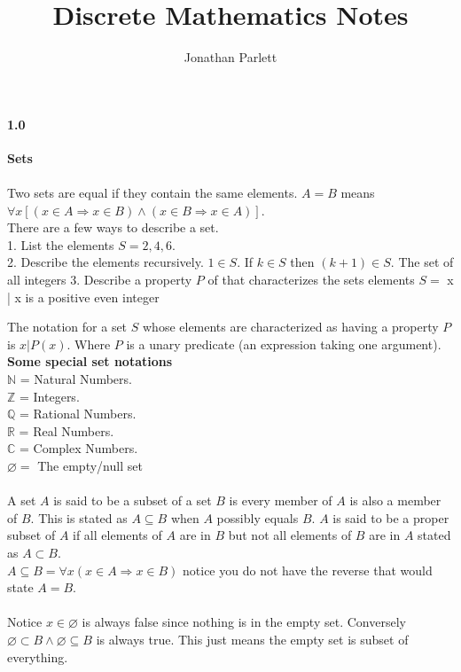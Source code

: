 \documentclass[14pt]{extreport}
\title{Discrete Mathematics Notes}
\author{Jonathan Parlett}
\begin{document}
\paragraph{1.0} \textbf{Sets}\\\\

Two sets are equal if they contain the same elements. $A = B$ means $\forall x[(x \in A \Rightarrow x \in B) \land (x \in B \Rightarrow x \in A)]$.\\

There are a few ways to describe a set.\\
1. List the elements $S = {2, 4 ,6}$.\\
2. Describe the elements recursively. $1 \in S$. If $k \in S$ then $(k+1) \in S$. The set of all integers
3. Describe a property $P$ of that characterizes the sets elements $S =$ {x | x is a positive even integer}

The notation for a set $S$ whose elements are characterized as having a property $P$ is ${x | P(x)}$. Where $P$ is a unary predicate (an expression taking one argument).\\

\textbf{Some special set notations}\\
$\mathbb{N}$ = Natural Numbers.\\
$\mathbb{Z}$ = Integers.\\
$\mathbb{Q}$ = Rational Numbers.\\
$\mathbb{R}$ = Real Numbers.\\
$\mathbb{C}$ = Complex Numbers.\\
$\varnothing = $ The empty/null set\\\\

A set $A$ is said to be a subset of a set $B$ is every member of $A$ is also a member of $B$. This is stated as $ A \subseteq B$ when $A$ possibly equals $B$.
$A$ is said to be a proper subset of $A$ if all elements of $A$ are in $B$ but not all elements of $B$ are in $A$ stated as $ A \subset B$.\\

$A \subseteq B = \forall x(x \in A \Rightarrow x \in B)$ notice you do not have the reverse that would state $A=B$.\\\\

Notice $x \in \varnothing$ is always false since nothing is in the empty set. Conversely $\varnothing \subset B \land \varnothing \subseteq B$ is always true. This just means the empty set is subset of everything.\\\\
\end{document}
